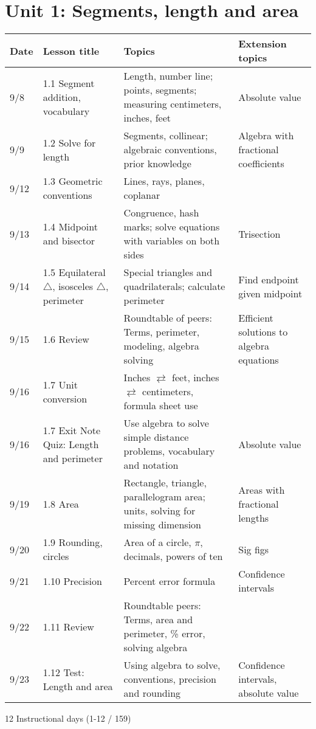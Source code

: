 

\geometry{hoffset=-0.5in, textwidth=7.5in}

\fancyhead[RE]{\thepage}
\fancyhead[RO]{\thepage }%



\section*{Unit 1: Segments, length and area}
\begin{tabular}{|p{0.9cm}|p{4cm}|p{7cm}|p{5cm}|}
  \hline
  Date & Lesson title & Topics  & Extension topics \\
  \hline
  9/8 & 1.1 Segment addition, vocabulary & Length, number line; points, segments; measuring centimeters, inches, feet & Absolute value \\
  \hline
  9/9 & 1.2 Solve for length & Segments, collinear; algebraic conventions, prior knowledge & Algebra with fractional coefficients \\
  \hline
  9/12 & 1.3 Geometric conventions & Lines, rays, planes, coplanar &  \\
  \hline
  9/13 & 1.4 Midpoint and bisector & Congruence, hash marks; solve equations with variables on both sides & Trisection \\
  \hline
  9/14 & 1.5 Equilateral $\triangle$, isosceles $\triangle$, perimeter & Special triangles and quadrilaterals; calculate perimeter & Find endpoint given midpoint \\
  \hline
  9/15 & 1.6 Review & Roundtable of peers: Terms, perimeter, modeling, algebra solving & Efficient solutions to algebra equations \\
  \hline
  9/16 & 1.7 Unit conversion & Inches $\rightleftarrows$ feet, inches $\rightleftarrows$ centimeters, formula sheet use &  \\
  \hline
  9/16 & 1.7 Exit Note Quiz: Length and perimeter & Use algebra to solve simple distance problems, vocabulary and notation & Absolute value \\
  \hline
  9/19 & 1.8 Area & Rectangle, triangle, parallelogram area; units, solving for missing dimension & Areas with fractional lengths \\
  \hline
  9/20 & 1.9 Rounding, circles & Area of a circle, $\pi$, decimals, powers of ten & Sig figs \\
  \hline
  9/21 & 1.10 Precision & Percent error formula & Confidence intervals \\
  \hline
  9/22 & 1.11 Review & Roundtable peers: Terms, area and perimeter, \% error, solving algebra & \\
  \hline
  9/23 & 1.12 Test: Length and area & Using algebra to solve, conventions, precision and rounding & Confidence intervals, absolute value \\
  \hline

\end{tabular} \par \vspace*{0.3cm}
12 Instructional days (1-12 / 159)

